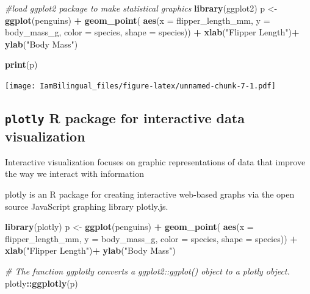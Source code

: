 \documentclass[]{book}
\newenvironment{Shaded}{\begin{snugshade}}{\end{snugshade}}
\newcommand{\CommentTok}[1]{\textcolor[rgb]{0.56,0.35,0.01}{\textit{#1}}}
\newcommand{\DataTypeTok}[1]{\textcolor[rgb]{0.13,0.29,0.53}{#1}}
\newcommand{\KeywordTok}[1]{\textcolor[rgb]{0.13,0.29,0.53}{\textbf{#1}}}
\newcommand{\NormalTok}[1]{#1}
\newcommand{\OperatorTok}[1]{\textcolor[rgb]{0.81,0.36,0.00}{\textbf{#1}}}
\newcommand{\StringTok}[1]{\textcolor[rgb]{0.31,0.60,0.02}{#1}}
\begin{document}
\begin{Shaded}
\begin{Highlighting}[]
\CommentTok{#load ggplot2 package to make statistical graphics}
\KeywordTok{library}\NormalTok{(ggplot2)}
\NormalTok{p <-}\StringTok{ }\KeywordTok{ggplot}\NormalTok{(penguins) }\OperatorTok{+}
\StringTok{  }\KeywordTok{geom_point}\NormalTok{( }\KeywordTok{aes}\NormalTok{(}\DataTypeTok{x =}\NormalTok{ flipper_length_mm,}
                  \DataTypeTok{y =}\NormalTok{ body_mass_g,}
                  \DataTypeTok{color =}\NormalTok{ species,}
                  \DataTypeTok{shape =}\NormalTok{ species)) }\OperatorTok{+}
\StringTok{  }\KeywordTok{xlab}\NormalTok{(}\StringTok{"Flipper Length"}\NormalTok{)}\OperatorTok{+}
\StringTok{  }\KeywordTok{ylab}\NormalTok{(}\StringTok{"Body Mass"}\NormalTok{)}

\KeywordTok{print}\NormalTok{(p)}
\end{Highlighting}
\end{Shaded}

\texttt{[image: IamBilingual\_files/figure-latex/unnamed-chunk-7-1.pdf]}

\hypertarget{plotly-r-package-for-interactive-data-visualization}{%
\subsection{\texorpdfstring{\texttt{plotly} R package for interactive data visualization}{plotly R package for interactive data visualization}}\label{plotly-r-package-for-interactive-data-visualization}}

Interactive visualization focuses on graphic representations of data that improve the way we interact with information

plotly is an R package for creating interactive web-based graphs via the open source JavaScript graphing library plotly.js.

\begin{Shaded}
\begin{Highlighting}[]
\KeywordTok{library}\NormalTok{(plotly)}
\NormalTok{p <-}\StringTok{ }\KeywordTok{ggplot}\NormalTok{(penguins) }\OperatorTok{+}
\StringTok{  }\KeywordTok{geom_point}\NormalTok{( }\KeywordTok{aes}\NormalTok{(}\DataTypeTok{x =}\NormalTok{ flipper_length_mm,}
                  \DataTypeTok{y =}\NormalTok{ body_mass_g,}
                  \DataTypeTok{color =}\NormalTok{ species,}
                  \DataTypeTok{shape =}\NormalTok{ species)) }\OperatorTok{+}
\StringTok{  }\KeywordTok{xlab}\NormalTok{(}\StringTok{"Flipper Length"}\NormalTok{)}\OperatorTok{+}
\StringTok{  }\KeywordTok{ylab}\NormalTok{(}\StringTok{"Body Mass"}\NormalTok{)}

\CommentTok{# The function ggplotly converts a ggplot2::ggplot() object to a plotly object.}
\NormalTok{plotly}\OperatorTok{::}\KeywordTok{ggplotly}\NormalTok{(p)}
\end{Highlighting}
\end{Shaded}
\end{document}
